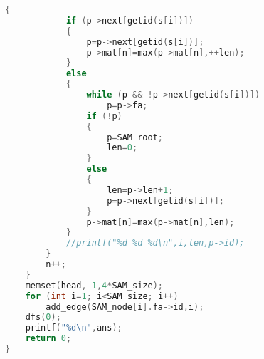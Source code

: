 \begin{lstlisting}[language=c++]
        {
            if (p->next[getid(s[i])])
            {
                p=p->next[getid(s[i])];
                p->mat[n]=max(p->mat[n],++len);
            }
            else
            {
                while (p && !p->next[getid(s[i])])
                    p=p->fa;
                if (!p)
                {
                    p=SAM_root;
                    len=0;
                }
                else
                {
                    len=p->len+1;
                    p=p->next[getid(s[i])];
                }
                p->mat[n]=max(p->mat[n],len);
            }
            //printf("%d %d %d\n",i,len,p->id);
        }
        n++;
    }
    memset(head,-1,4*SAM_size);
    for (int i=1; i<SAM_size; i++)
        add_edge(SAM_node[i].fa->id,i);
    dfs(0);
    printf("%d\n",ans);
    return 0;
}
    \end{lstlisting}